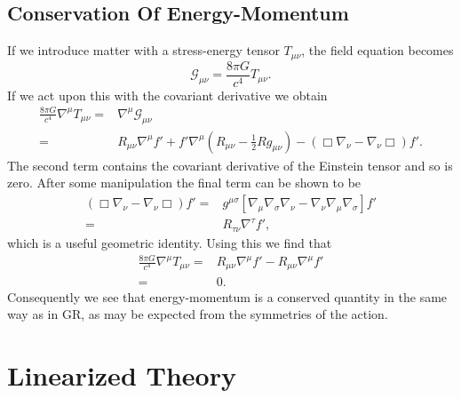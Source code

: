 \documentclass[a4paper, 11pt, titlepage, twoside]{report}
\newcommand{\recip}[1]{\ensuremath{\frac{1}{#1}}}
\begin{document}
\subsection{Conservation Of Energy-Momentum}

If we introduce matter with a stress-energy tensor $T_{\mu\nu}$, the field equation becomes
\begin{equation}
\mathcal{G}_{\mu\nu} = \frac{8\pi G}{c^4}T_{\mu\nu}.
\end{equation}
If we act upon this with the covariant derivative we obtain
\begin{align}
\frac{8\pi G}{c^4}\nabla^\mu T_{\mu\nu} = {} & \nabla^\mu\mathcal{G}_{\mu\nu} \nonumber \\
= {} & R_{\mu\nu}\nabla^\mu f' + f'\nabla^\mu\left(R_{\mu\nu} - \recip{2}R g_{\mu\nu}\right) - \left(\Box\nabla_\nu - \nabla_\nu\Box\right)f'.
\end{align}
The second term contains the covariant derivative of the Einstein tensor and so is zero. After some manipulation the final term can be shown to be
\begin{align}
\left(\Box\nabla_\nu - \nabla_\nu\Box\right)f' = {} & g^{\mu\sigma}\left[\nabla_\mu\nabla_\sigma\nabla_\nu - \nabla_\nu\nabla_\mu\nabla_\sigma\right]f' \nonumber \\
 = {} & R_{\tau\nu}\nabla^\tau f',
\end{align}
which is a useful geometric identity\cite{Koivisto2006a}. Using this we find that
\begin{align}
\frac{8\pi G}{c^4}\nabla^\mu T_{\mu\nu} = {} & R_{\mu\nu}\nabla^\mu f' - R_{\mu\nu}\nabla^\mu f' \nonumber \\
 = {} & 0.
\end{align}
Consequently we see that energy-momentum is a conserved quantity in the same way as in GR, as may be expected from the symmetries of the action.

\section{Linearized Theory}\label{sec:Lin}
\end{document}
